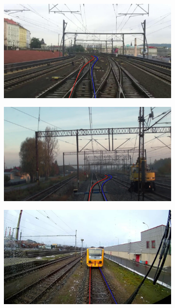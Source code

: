 \begin{figure}[H]
    \begin{subfigure}{0.328\textwidth}
        \includegraphics[width=\linewidth]{PICs/datasets/TEP_dataset/annotated_rs00007.jpg}
    \end{subfigure}
    \hfill
    \begin{subfigure}{0.328\textwidth}
        \includegraphics[width=\linewidth]{PICs/datasets/TEP_dataset/annotated_rs00107.jpg}
    \end{subfigure}
    \hfill
    \begin{subfigure}{0.328\textwidth}
        \includegraphics[width=\linewidth]{PICs/datasets/TEP_dataset/annotated_rs00244.jpg}
    \end{subfigure}


\end{figure}

